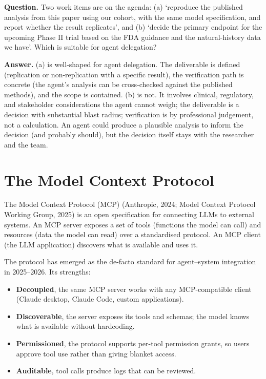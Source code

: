 \documentclass[
  letterpaper,
  11pt]{scrbook}
\providecommand{\tightlist}{%
  \setlength{\itemsep}{0pt}\setlength{\parskip}{0pt}}
\begin{document}
\begin{tcolorbox}[enhanced jigsaw, arc=.35mm, bottomrule=.15mm, bottomtitle=1mm, breakable, colback=white, colbacktitle=quarto-callout-note-color!10!white, colframe=quarto-callout-note-color-frame, coltitle=black, left=2mm, leftrule=.75mm, opacityback=0, opacitybacktitle=0.6, rightrule=.15mm, title={Check your understanding: when not to delegate}, titlerule=0mm, toprule=.15mm, toptitle=1mm]

\textbf{Question.} Two work items are on the agenda: (a) `reproduce the
published analysis from this paper using our cohort, with the same model
specification, and report whether the result replicates', and (b)
`decide the primary endpoint for the upcoming Phase II trial based on
the FDA guidance and the natural-history data we have'. Which is
suitable for agent delegation?

\textbf{Answer.} (a) is well-shaped for agent delegation. The
deliverable is defined (replication or non-replication with a specific
result), the verification path is concrete (the agent's analysis can be
cross-checked against the published methods), and the scope is
contained. (b) is not. It involves clinical, regulatory, and stakeholder
considerations the agent cannot weigh; the deliverable is a decision
with substantial blast radius; verification is by professional
judgement, not a calculation. An agent could produce a plausible
analysis to inform the decision (and probably should), but the decision
itself stays with the researcher and the team.

\end{tcolorbox}

\section{The Model Context Protocol}\label{the-model-context-protocol}

The Model Context Protocol (MCP) (Anthropic, 2024; Model Context
Protocol Working Group, 2025) is an open specification for connecting
LLMs to external systems. An MCP server exposes a set of tools
(functions the model can call) and resources (data the model can read)
over a standardised protocol. An MCP client (the LLM application)
discovers what is available and uses it.

The protocol has emerged as the de-facto standard for agent--system
integration in 2025--2026. Its strengths:

\begin{itemize}
\tightlist
\item
  \textbf{Decoupled}, the same MCP server works with any MCP-compatible
  client (Claude desktop, Claude Code, custom applications).
\item
  \textbf{Discoverable}, the server exposes its tools and schemas; the
  model knows what is available without hardcoding.
\item
  \textbf{Permissioned}, the protocol supports per-tool permission
  grants, so users approve tool use rather than giving blanket access.
\item
  \textbf{Auditable}, tool calls produce logs that can be reviewed.
\end{itemize}
\end{document}
